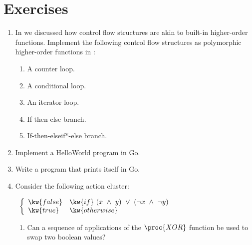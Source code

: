 \section*{Exercises}

\renewcommand{\theenumi}{\bf\arabic{enumi}}

\begin{enumerate}

\item {} In  we discussed how
control flow structures are akin to built-in higher-order functions. Implement
the following control flow structures as polymorphic higher-order functions in
\fun:

\begin{enumerate}

\item A counter loop.

\item A conditional loop.

\item An iterator loop.

\item If-then-else branch.

\item If-then-elseif*-else branch.

\end{enumerate}

\item Implement a HelloWorld program in Go.

\item Write a program that prints itself in Go.

\item Consider the following action cluster:

\begin{codebox}
\zi {}\ $\left\{
\begin{array}{ll}
\kw{false} & \kw{if}\ (x\ \wedge\ y)\ \vee\ (\neg x\ \wedge\ \neg y)\\
\kw{true} & \kw{otherwise}
\end{array}
\right.$
\end{codebox}

\begin{enumerate}

\item Can a sequence of applications of the $\proc{XOR}$ function be used to
swap two boolean values?


\end{enumerate}
\end{enumerate}
